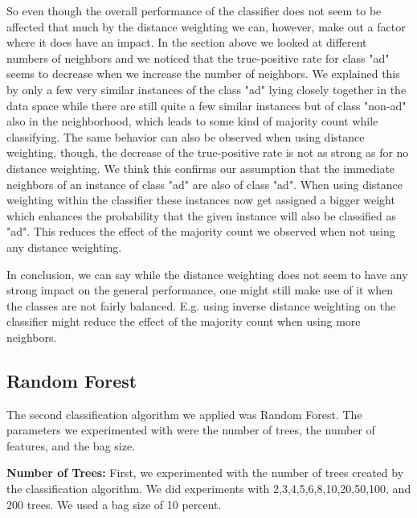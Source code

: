 \documentclass{article}
\begin{document}
So even though the overall performance of the classifier does not seem to be affected that much by the distance weighting we can, however, make out a factor where it does have an impact. In the section above we looked at different numbers of neighbors and we noticed that the true-positive rate for class "ad" seems to decrease when we increase the number of neighbors. We explained this by only a few very similar instances of the class "ad" lying closely together in the data space while there are still quite a few similar instances but of class "non-ad" also in the neighborhood, which leads to some kind of majority count while classifying. The same behavior can also be observed when using distance weighting, though, the decrease of the true-positive rate is not as strong as for no distance weighting. We think this confirms our assumption that the immediate neighbors of an instance of class "ad" are also of class "ad". When using distance weighting within the classifier these instances now get assigned a bigger weight which enhances the probability that the given instance will also be classified as "ad". This reduces the effect of the majority count we observed when not using any distance weighting.

In conclusion, we can say while the distance weighting does not seem to have any strong impact on the general performance, one might still make use of it when the classes are not fairly balanced. E.g. using inverse distance weighting on the classifier might reduce the effect of the majority count when using more neighbors.


\subsection{Random Forest}
The second classification algorithm we applied was Random Forest. The parameters we experimented with were the number of trees, the number of features, and the bag size.

\textbf{Number of Trees:}
First, we experimented with the number of trees created by the classification algorithm. We did experiments with 2,3,4,5,6,8,10,20,50,100, and 200 trees. We used a bag size of 10 percent.
\end{document}
